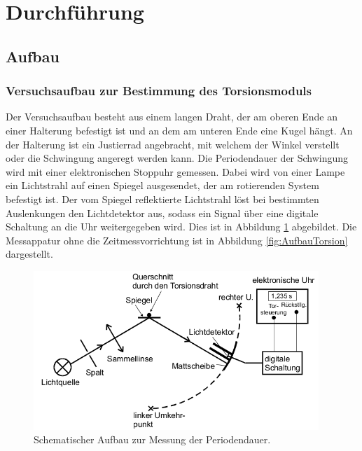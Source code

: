  \section{Durchführung}
\label{sec:Durchführung}


\subsection{Aufbau}


\subsubsection{Versuchsaufbau zur Bestimmung des Torsionsmoduls}
\label{sec:AufbauTorsion}

Der Versuchsaufbau besteht aus einem langen Draht, der am oberen Ende an einer
Halterung befestigt ist und an dem am unteren Ende eine Kugel hängt.
An der Halterung ist ein Justierrad angebracht, mit welchem der Winkel
verstellt oder die Schwingung angeregt werden kann.
Die Periodendauer der Schwingung wird mit einer elektronischen Stoppuhr
gemessen. Dabei wird von einer Lampe ein Lichtstrahl auf einen
Spiegel ausgesendet, der am rotierenden System befestigt ist.
Der vom Spiegel reflektierte Lichtstrahl löst bei
bestimmten Auslenkungen den Lichtdetektor aus, sodass ein Signal über eine
digitale Schaltung an die Uhr weitergegeben wird.
Dies ist in Abbildung \ref{fig:AufbauPeriode} abgebildet.
Die Messappatur ohne die Zeitmessvorrichtung ist in Abbildung
\ref{fig:AufbauTorsion} dargestellt.

\begin{figure}
  \centering
  \includegraphics[height=6cm]{Zeitmessung.png}
  \caption{Schematischer Aufbau zur Messung der Periodendauer.\cite{anleitung}}
  \label{fig:AufbauPeriode}
\end{figure}

